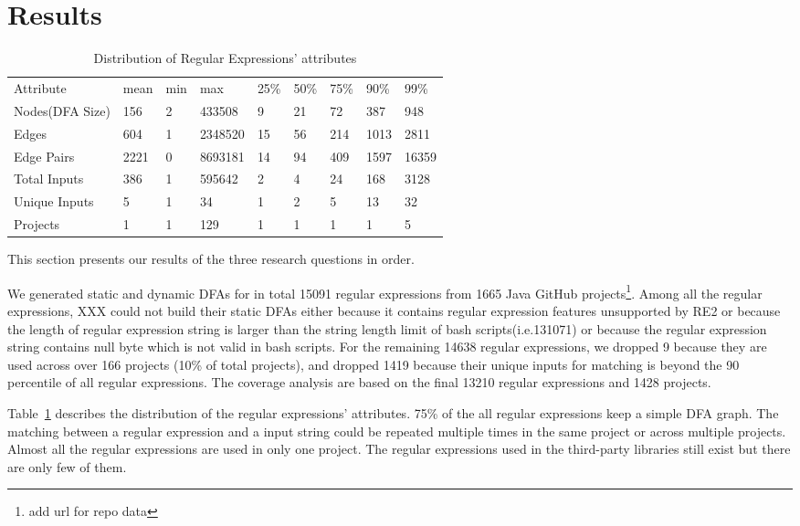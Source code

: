 \section{Results}
\label{sec:results}
\begin{table}[t]
\centering
\caption{Distribution of Regular Expressions' attributes}
\label{regex:distr}
\begin{tabular}{lllllllll}
Attribute       & mean & min & max     & 25\% & 50\% & 75\% & 90\% & 99\%  \\
Nodes(DFA Size) & 156  & 2   & 433508  & 9    & 21   & 72   & 387  & 948   \\
Edges           & 604  & 1   & 2348520 & 15   & 56   & 214  & 1013 & 2811  \\
Edge Pairs      & 2221 & 0   & 8693181 & 14   & 94   & 409  & 1597 & 16359 \\
Total Inputs    & 386  & 1   & 595642  & 2    & 4    & 24   & 168  & 3128  \\
Unique Inputs   & 5    & 1   & 34      & 1    & 2    & 5    & 13   & 32    \\
Projects		& 1	   & 1	 & 129    & 1    & 1     & 1    & 1    & 5
\end{tabular}
\end{table}
This section presents our results of the three research questions in order. 

We generated static and dynamic DFAs for in total 15091 regular expressions from 1665 Java GitHub projects\footnote{add url for repo data}. Among all the regular expressions, XXX could not build their static DFAs either because it contains regular expression features unsupported by RE2 or because the length of regular expression string is larger than the string length limit of bash scripts(i.e.131071) or because the regular expression string contains null byte which is not valid in bash scripts. For the remaining 14638 regular expressions, we dropped 9 because they are used across over 166 projects (10\% of total projects), and dropped 1419 because their unique inputs for matching is beyond the 90 percentile of all regular expressions. The coverage analysis are based on the final 13210 regular expressions and 1428 projects. 

Table~\ref{regex:distr} describes the distribution of the regular expressions' attributes. 75\% of the all regular expressions keep a simple DFA graph. The matching between a regular expression and a input string could be repeated multiple times in the same project or across multiple projects. Almost all the regular expressions are used in only one project. The regular expressions used in the third-party libraries still exist but there are only few of them.




